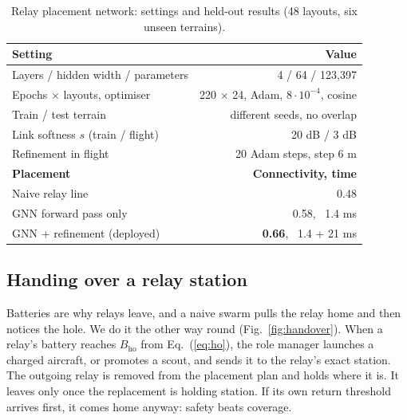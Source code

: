 \documentclass[10pt,a4paper,twocolumn]{article}
\begin{document}
\begin{table}[t]
\centering
\caption{Relay placement network: settings and held-out results (48 layouts, six unseen terrains).}
\label{tab:gnn}
\footnotesize
\renewcommand{\arraystretch}{1.08}
\begin{tabularx}{\columnwidth}{@{}Xr@{}}
\toprule
\textsf{\textbf{Setting}} & \textsf{\textbf{Value}}\\
\midrule
Layers / hidden width / parameters & 4 / 64 / 123{,}397\\
Epochs $\times$ layouts, optimiser & 220 $\times$ 24, Adam, $8\cdot10^{-4}$, cosine\\
Train / test terrain & different seeds, no overlap\\
Link softness $s$ (train / flight) & 20 dB / 3 dB\\
Refinement in flight & 20 Adam steps, step 6 m\\
\midrule
\textsf{\textbf{Placement}} & \textsf{\textbf{Connectivity, time}}\\
\midrule
Naive relay line & 0.48\\
GNN forward pass only & 0.58, \ 1.4 ms\\
GNN + refinement (deployed) & \textbf{0.66}, \ 1.4 + 21 ms\\
\bottomrule
\end{tabularx}
\end{table}

\subsection{Handing over a relay station}
Batteries are why relays leave, and a naive swarm pulls the relay home and then notices the hole. We do it the other way round (Fig.~\ref{fig:handover}). When a relay's battery reaches $B_{\mathrm{ho}}$ from Eq.~(\ref{eq:ho}), the role manager launches a charged aircraft, or promotes a scout, and sends it to the relay's exact station. The outgoing relay is removed from the placement plan and holds where it is. It leaves only once the replacement is holding station. If its own return threshold arrives first, it comes home anyway: safety beats coverage.
\end{document}
